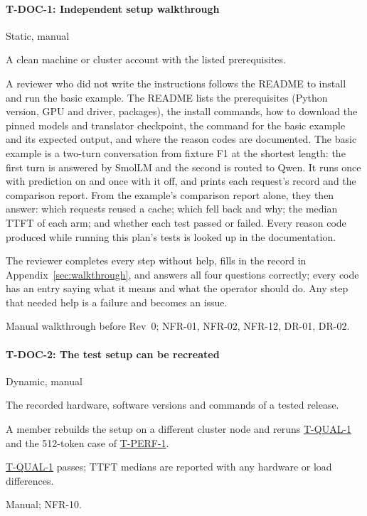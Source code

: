 \documentclass[12pt, titlepage]{article}
\newenvironment{testcase}[2]
  {\Needspace{8\baselineskip}\paragraph{#1: #2}\phantomsection\label{test:#1}\sloppy
   \begin{description}[style=sameline, leftmargin=3.6cm, labelwidth=3.4cm,
     font=\normalfont\bfseries, itemsep=2pt, topsep=2pt]}
  {\end{description}}
\newcommand{\tref}[1]{\hyperref[test:#1]{#1}}
\begin{document}
\begin{testcase}{T-DOC-1}{Independent setup walkthrough}
\item[Type] Static, manual
\item[Initial state] A clean machine or cluster account with the listed
prerequisites.
\item[Input/Condition] A reviewer who did not write the instructions
follows the README to install \progname{} and run the basic example. The
README lists the prerequisites (Python version, GPU and driver, packages),
the install commands, how to download the pinned models and translator
checkpoint, the command for the basic example and its expected output, and
where the reason codes are documented. The basic example is a two-turn
conversation from fixture F1 at the shortest length: the first turn is
answered by SmolLM and the second is routed to Qwen. It runs once with
prediction on and once with it off, and prints each request's record and
the comparison report. From
the example's comparison report alone, they then answer: which requests
reused a cache; which fell back and why; the median TTFT of each arm; and
whether each test passed or failed. Every reason code produced while running
this plan's tests is looked up in the documentation.
\item[Output/Result] The reviewer completes every step without help, fills
in the record in Appendix~\ref{sec:walkthrough}, and answers all four
questions correctly; every code has an entry saying what it means and what
the operator should do. Any step that needed help is a failure and becomes
an issue.
\item[How performed] Manual walkthrough before Rev~0; NFR-01, NFR-02,
NFR-12, DR-01, DR-02.
\end{testcase}

\begin{testcase}{T-DOC-2}{The test setup can be recreated}
\item[Type] Dynamic, manual
\item[Initial state] The recorded hardware, software versions and commands
of a tested release.
\item[Input/Condition] A member rebuilds the setup on a different cluster
node and reruns \tref{T-QUAL-1} and the 512-token case of
\tref{T-PERF-1}.
\item[Output/Result] \tref{T-QUAL-1} passes; TTFT medians are reported with
any hardware or load differences.
\item[How performed] Manual; NFR-10.
\end{testcase}
\end{document}
